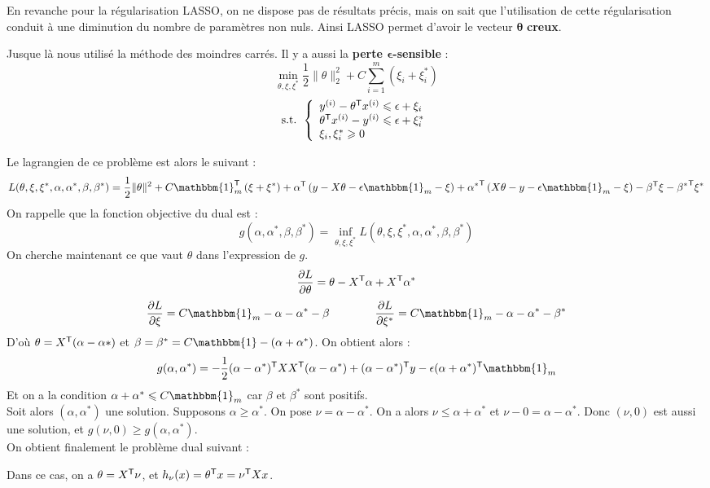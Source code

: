 En revanche pour la régularisation LASSO, on ne dispose pas de résultats précis, mais on sait que l'utilisation de cette régularisation conduit à une diminution du nombre de paramètres non nuls. Ainsi LASSO permet d'avoir le vecteur $\bm{\theta}$ \textbf{creux}.


Jusque là nous utilisé la méthode des moindres carrés. Il y a aussi la \textbf{perte $\bm{\epsilon}$-sensible} :
$$ \min_{\theta, \xi, \xi^*} \frac{1}{2} \| \theta \|_2^2 + C \sum_{i = 1}^m \left( \xi_i + \xi_i^* \right) $$
\vspace{-2mm}
$$ \text{s.t. } \left\{ \begin{array}{l}
	y^{(i)} - \theta^{\mathsf{T}} x^{(i)} \leqslant \epsilon + \xi_i \\
	\theta^{\mathsf{T}} x^{(i)} - y^{(i)} \leqslant \epsilon + \xi_i^* \\
	\xi_i, \xi_i^* \geqslant 0
\end{array} \right. $$

Le lagrangien de ce problème est alors le suivant :
$$ L(\theta, \xi, \xi^*, \alpha, \alpha^*, \beta, \beta^*) = \dfrac{1}{2} \| \theta \|^2 + C \mathbbm{1}_m^\trans \left( \xi + \xi^* \right) + \alpha^\trans \left( y - X \theta - \epsilon \mathbbm{1}_m - \xi \right) + {\alpha^*}^\trans \left( X \theta - y - \epsilon \mathbbm{1}_m - \xi \right) - \beta^\trans \xi - {\beta^*}^\trans \xi^*$$
On rappelle que la fonction objective du dual est :
$$ g(\alpha, \alpha^*, \beta, \beta^*) = \inf_{\theta, \xi, \xi^*} L(\theta, \xi, \xi^*, \alpha, \alpha^*, \beta, \beta^*) $$
On cherche maintenant ce que vaut $\theta$ dans l'expression de $g$.
$$ \dfrac{\partial L}{\partial \theta} = \theta - X^{\mathsf{T}} \alpha + X^{\mathsf{T}} \alpha^* $$
$$ \dfrac{\partial L}{\partial \xi} = C \mathbbm{1}_m - \alpha - \alpha^* - \beta \qquad \qquad
\dfrac{\partial L}{\partial \xi^*} = C \mathbbm{1}_m - \alpha - \alpha^* - \beta^* $$
D'où $\theta = X^{\mathsf{T}} (\alpha - \alpha*)$ et $\beta = \beta^* = C \mathbbm{1} - (\alpha + \alpha^*)$. On obtient alors :
$$ g(\alpha, \alpha^*) = -\dfrac{1}{2} (\alpha - \alpha^*)^\trans X X^\trans (\alpha - \alpha^*) + (\alpha - \alpha^*)^\trans y - \epsilon (\alpha + \alpha^*)^\trans \mathbbm{1}_m $$
Et on a la condition $\alpha + \alpha^* \leqslant C \mathbbm{1}_m$ car $\beta$ et $\beta^*$ sont positifs. \\ Soit alors $(\alpha, \alpha^*)$ une solution. Supposons $\alpha \geqslant \alpha^*$. On pose $\nu = \alpha - \alpha^*$. On a alors $\nu \leqslant \alpha + \alpha^*$ et $\nu - 0 = \alpha - \alpha^*$. Donc $(\nu, 0)$ est aussi une solution, et $g(\nu, 0) \geqslant g(\alpha, \alpha^*)$. \\
On obtient finalement le problème dual suivant :
\begin{center}
\end{center}
Dans ce cas, on a $\theta = X^{\mathsf{T}} \nu$, et $h_\nu(x) = \theta^{\mathsf{T}} x = \nu^{\mathsf{T}} X x$.

